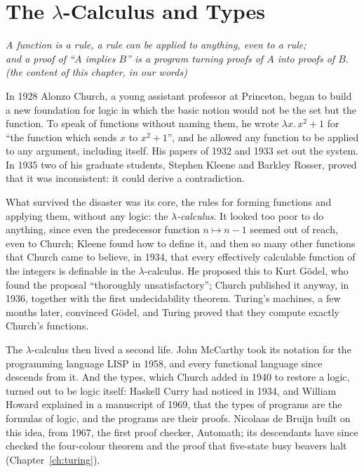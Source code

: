\chapter{The \texorpdfstring{$\lambda$}{Lambda}-Calculus and Types}\label{ch:lambda}

\begin{center}\itshape
A function is a rule, a rule can be applied to anything, even to a rule;\\
and a proof of ``$A$ implies $B$'' is a program turning proofs of $A$ into proofs of $B$.\\
\upshape(the content of this chapter, in our words)
\end{center}

In 1928 Alonzo Church, a young assistant professor at Princeton, began to build a new foundation for logic in which the basic notion would not be the set but the function. To speak of functions without naming them, he wrote $\lambda x.\,x^2+1$ for ``the function which sends $x$ to $x^2+1$'', and he allowed any function to be applied to any argument, including itself. His papers of 1932 and 1933 set out the system. In 1935 two of his graduate students, Stephen Kleene and Barkley Rosser, proved that it was inconsistent: it could derive a contradiction.

What survived the disaster was its core, the rules for forming functions and applying them, without any logic: the \emph{$\lambda$-calculus}. It looked too poor to do anything, since even the predecessor function $n\mapsto n-1$ seemed out of reach, even to Church; Kleene found how to define it, and then so many other functions that Church came to believe, in 1934, that every effectively calculable function of the integers is definable in the $\lambda$-calculus. He proposed this to Kurt Gödel, who found the proposal ``thoroughly unsatisfactory''; Church published it anyway, in 1936, together with the first undecidability theorem. Turing's machines, a few months later, convinced Gödel, and Turing proved that they compute exactly Church's functions.

The $\lambda$-calculus then lived a second life. John McCarthy took its notation for the programming language LISP in 1958, and every functional language since descends from it. And the types, which Church added in 1940 to restore a logic, turned out to be logic itself: Haskell Curry had noticed in 1934, and William Howard explained in a manuscript of 1969, that the types of programs are the formulas of logic, and the programs are their proofs. Nicolaas de Bruijn built on this idea, from 1967, the first proof checker, Automath; its descendants have since checked the four-colour theorem and the proof that five-state busy beavers halt (Chapter~\ref{ch:turing}).

